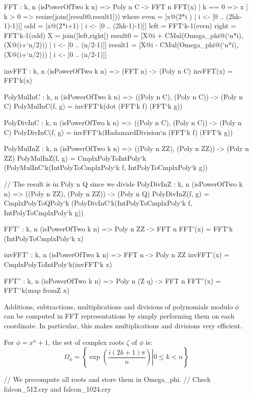 \begin{code}
  FFT : {k, n} (isPowerOfTwo k n) => Poly n C -> FFT n
  FFT(x)
    | k == 0 => x
    | k >  0 => resize(join([result0,result1])) where
        even = [x@(2*i  ) | i <- [0 .. (2^^(k-1)-1)]]
        odd =  [x@(2*i+1) | i <- [0 .. (2^^(k-1)-1)]]
        left = FFT`{k-1}(even)
        right = FFT`{k-1}(odd)
        X = join([left,right])
        result0 =
          [X@i + CMul(Omega_phi@(`n*i),(X@(i+`n/2))) | i <- [0 .. (n/2-1)]]
        result1 =
          [X@i - CMul(Omega_phi@(`n*i),(X@(i+`n/2))) | i <- [0 .. (n/2-1)]]

  invFFT  : {k, n} (isPowerOfTwo k n) => (FFT n) -> (Poly n C)
  invFFT(x) = FFT`{k}(x)

  PolyMulInC : {k, n} (isPowerOfTwo k n) =>
    ((Poly n C), (Poly n C)) -> (Poly n C)
  PolyMulInC(f, g) = invFFT`{k}(dot (FFT`{k} f) (FFT`{k} g))

  PolyDivInC : {k, n} (isPowerOfTwo k n) =>
    ((Poly n C), (Poly n C)) -> (Poly n C)
  PolyDivInC(f, g) = invFFT`{k}(HadamardDivision`{n} (FFT`{k} f) (FFT`{k} g))

  PolyMulInZ : {k, n} (isPowerOfTwo k n) =>
    ((Poly n ZZ), (Poly n ZZ)) -> (Poly n ZZ)
  PolyMulInZ(f, g) = CmplxPolyToIntPoly`{k}
    (PolyMulInC`{k}(IntPolyToCmplxPoly`{k} f, IntPolyToCmplxPoly`{k} g))

  // The result is in Poly n Q since we divide
  PolyDivInZ : {k, n} (isPowerOfTwo k n) =>
    ((Poly n ZZ), (Poly n ZZ)) -> (Poly n Q)
  PolyDivInZ(f, g) = CmplxPolyToQPoly`{k}
    (PolyDivInC`{k}(IntPolyToCmplxPoly`{k} f, IntPolyToCmplxPoly`{k} g))

  FFT' : {k, n} (isPowerOfTwo k n) => Poly n ZZ -> FFT n
  FFT'(x) = FFT`{k} (IntPolyToCmplxPoly`{k} x)

  invFFT' : {k, n} (isPowerOfTwo k n) => FFT n -> Poly n ZZ
  invFFT'(x) = CmplxPolyToIntPoly`{k}(invFFT`{k} x)

  FFT'' : {k, n} (isPowerOfTwo k n) => Poly n (Z q) -> FFT n
  FFT''(x) = FFT'`{k}(map fromZ x)
\end{code}

 Additions, subtractions, multiplications and divisions of polynomials
 modulo $\phi$ can be computed in FFT representations by simply
 performing them on each coordinate. In particular, this makes
 multiplications and divisions very efficient.

 For $\phi = x^n + 1$, the set of complex roots $\zeta$ of $\phi$ is:
 \begin{equation}\label{eq:phi}
 \Omega_\phi = \left\{\left. \exp\left(\frac{i (2k+1)\pi}{n}\right) \right| 0 \leq k < n \right\}
 \end{equation}
\begin{code}
  // We precompute all roots and store them in Omega_phi.
  // Check falcon_512.cry and falcon_1024.cry
\end{code}

